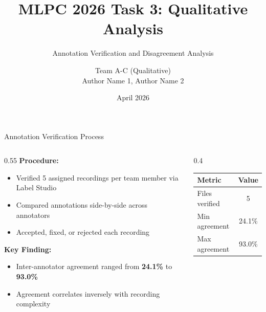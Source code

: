 \documentclass[aspectratio=169]{beamer}
\title{MLPC 2026 Task 3: Qualitative Analysis}
\subtitle{Annotation Verification and Disagreement Analysis}
\author{Team A-C (Qualitative) \\ Author Name 1, Author Name 2}
\date{April 2026}
\begin{document}
\begin{frame}
  \titlepage
\end{frame}

\begin{frame}{Annotation Verification Process}
  \begin{columns}[T]
    \begin{column}{0.55\textwidth}
      \textbf{Procedure:}
      \begin{itemize}
        \item Verified 5 assigned recordings per team member via Label Studio
        \item Compared annotations side-by-side across annotators
        \item Accepted, fixed, or rejected each recording
      \end{itemize}
      \vspace{0.5em}
      \textbf{Key Finding:}
      \begin{itemize}
        \item Inter-annotator agreement ranged from \textbf{24.1\%} to \textbf{93.0\%}
        \item Agreement correlates inversely with recording complexity
      \end{itemize}
    \end{column}
    \begin{column}{0.4\textwidth}
      \centering
      \small
      \begin{tabular}{lc}
        \toprule
        Metric & Value \\
        \midrule
        Files verified & 5 \\
        Min agreement & 24.1\% \\
        Max agreement & 93.0\% \\
        \bottomrule
      \end{tabular}
    \end{column}
  \end{columns}
\end{frame}
\end{document}
